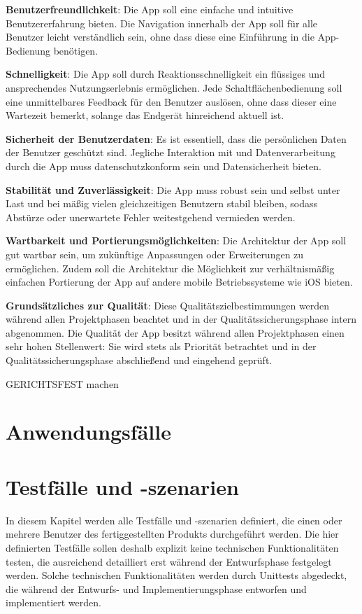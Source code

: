 \documentclass[oneside, ngerman]{sdqtechreport}
\begin{document}
\textbf{Benutzerfreundlichkeit}: Die App soll eine einfache und intuitive Benutzererfahrung bieten. Die Navigation innerhalb der App soll für alle Benutzer leicht verständlich sein, ohne dass diese eine Einführung in die App-Bedienung benötigen.

\textbf{Schnelligkeit}: Die App soll durch Reaktionsschnelligkeit ein flüssiges und ansprechendes Nutzungserlebnis ermöglichen. Jede Schaltflächenbedienung soll eine unmittelbares Feedback für den Benutzer auslösen, ohne dass dieser eine Wartezeit bemerkt, solange das Endgerät hinreichend aktuell ist.

\textbf{Sicherheit der Benutzerdaten}: Es ist essentiell, dass die persönlichen Daten der Benutzer geschützt sind. Jegliche Interaktion mit und Datenverarbeitung durch die App muss datenschutzkonform sein und Datensicherheit bieten.

\textbf{Stabilität und Zuverlässigkeit}: Die App muss robust sein und selbst unter Last und bei mäßig vielen gleichzeitigen Benutzern stabil bleiben, sodass Abstürze oder unerwartete Fehler weitestgehend vermieden werden.

\textbf{Wartbarkeit und Portierungsmöglichkeiten}: Die Architektur der App soll gut wartbar sein, um zukünftige Anpassungen oder Erweiterungen zu ermöglichen. Zudem soll die Architektur die Möglichkeit zur verhältnismäßig einfachen Portierung der App auf andere mobile Betriebssysteme wie iOS bieten. 

\textbf{Grundsätzliches zur Qualität}: Diese Qualitätszielbestimmungen werden während allen Projektphasen beachtet und in der Qualitätssicherungsphase intern abgenommen. Die Qualität der App besitzt während allen Projektphasen einen sehr hohen Stellenwert: Sie wird stets als Priorität betrachtet und in der Qualitätssicherungsphase abschließend und eingehend geprüft.

GERICHTSFEST machen



\chapter{Anwendungsfälle}
\label{chap:Anwendungsfälle}



\chapter{Testfälle und -szenarien}
\label{chap:Tests}

In diesem Kapitel werden alle Testfälle und -szenarien definiert, die einen oder mehrere Benutzer des fertiggestellten Produkts durchgeführt werden. Die hier definierten Testfälle sollen deshalb explizit keine technischen Funktionalitäten testen, die ausreichend detailliert erst während der Entwurfsphase festgelegt werden. Solche technischen Funktionalitäten werden durch Unittests abgedeckt, die während der Entwurfs- und Implementierungsphase entworfen und implementiert werden.
\end{document}
